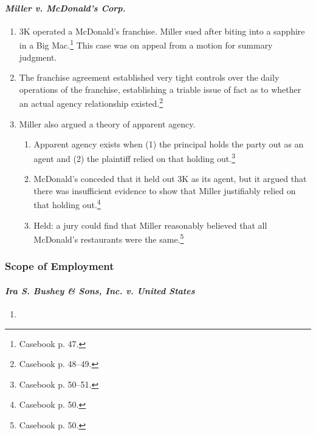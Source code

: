 \paragraph{\emph{Miller v. McDonald's Corp.}}

\begin{enumerate}
    \item 3K operated a McDonald's franchise. Miller sued after biting into a 
    sapphire in a Big Mac.\footnote{Casebook p. 47.} This case was on appeal 
    from a motion for summary judgment.
    \item The franchise agreement established very tight controls over the 
    daily operations of the franchise, establishing a triable issue of fact as 
    to whether an actual agency relationship existed.\footnote{Casebook p. 
    48--49.}
    \item Miller also argued a theory of apparent agency.
    \begin{enumerate}
        \item Apparent agency exists when (1) the principal holds the party 
        out as an agent and (2) the plaintiff relied on that holding 
        out.\footnote{Casebook p. 50--51.}
        \item McDonald's conceded that it held out 3K as its agent, but it 
        argued that there was insufficient evidence to show that Miller 
        justifiably relied on that holding out.\footnote{Casebook p. 50.}
        \item Held: a jury could find that Miller reasonably believed that all 
        McDonald's restaurants were the same.\footnote{Casebook p. 50.}
    \end{enumerate}
\end{enumerate}

\subsubsection{Scope of Employment}

\paragraph{\emph{Ira S. Bushey \& Sons, Inc. v. United States}}

\begin{enumerate}
    \item %
\end{enumerate}


